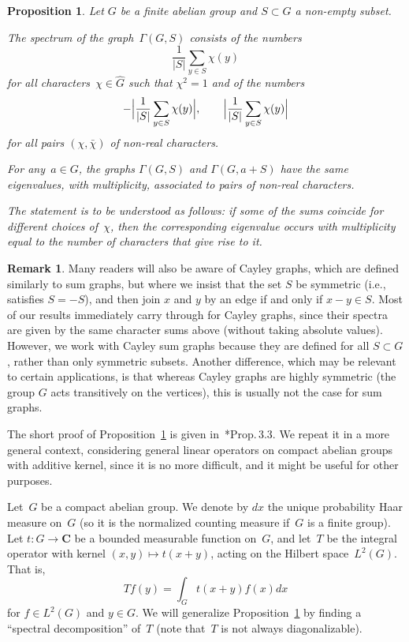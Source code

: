 \documentclass[12pt]{amsart}
\numberwithin{equation}{section}
\newcommand{\Cc}{\mathbf{C}}
\theoremstyle{plain}
\newtheorem{proposition}[theorem]{Proposition}
\theoremstyle{remark}
\theoremstyle{definition}
\newtheorem{remark}[theorem]{Remark}
\begin{document}
\begin{proposition}\label{pr-1}
  Let $G$ be a finite abelian group and $S\subset G$ a non-empty subset.
  \begin{enumth}
  \item The spectrum of the graph~$\Gamma(G,S)$ consists of the
    numbers
    \[
      \frac{1}{|S|}\sum_{y\in S}\chi(y)
    \]
    for all characters~$\chi\in \widehat{G}$ such that $\chi^2=1$ and of
    the numbers
    \[
      -\Bigl|\frac{1}{|S|}\sum_{y\in S}\chi(y)\Bigr|,\quad\quad
      \Bigl|\frac{1}{|S|}\sum_{y\in S}\chi(y)\Bigr|
    \]
    for all pairs $(\chi,\bar{\chi})$ of non-real characters.
    
  \item For any~$a\in G$, the graphs $\Gamma(G,S)$ and $\Gamma(G,a+S)$
    have the same eigenvalues, with multiplicity, associated to pairs
    of non-real characters.
\end{enumth}

The statement is to be understood as follows: if some of the sums coincide for different choices of~$\chi$, then the corresponding eigenvalue occurs with
multiplicity equal to the number of characters that give rise to it.
\end{proposition}

\begin{remark}
  Many readers will also be aware of Cayley graphs, which are defined
  similarly to sum graphs, but where we insist that the set $S$ be
  symmetric (i.e., satisfies $S=-S$), and then join $x$ and $y$ by an
  edge if and only if $x-y \in S$. Most of our results immediately carry
  through for Cayley graphs, since their spectra are given by the same
  character sums above (without taking absolute values). However, we
  work with Cayley sum graphs because they are defined for all
  $S \subset G$, rather than only symmetric subsets. Another difference,
  which may be relevant to certain applications, is that whereas Cayley
  graphs are highly symmetric (the group $G$ acts transitively on the
  vertices), this is usually not the case for sum graphs.
\end{remark}

The short proof of Proposition~\ref{pr-1} is given
in~\cite{short}*{Prop.\,3.3}. We repeat it in a more general context,
considering general linear operators on compact abelian groups with
additive kernel, since it is no more difficult, and it might be useful for
other purposes.

Let~$G$ be a compact abelian group. We denote by $dx$ the unique
probability Haar measure on~$G$ (so it is the normalized counting
measure if~$G$ is a finite group). Let $t\colon G\to\Cc$ be a bounded
measurable function on~$G$, and let~$T$ be the integral operator with
kernel $(x,y)\mapsto t(x+y)$, acting on the Hilbert space~$L^2(G)$. That is,
\[
  Tf(y)=\int_Gt(x+y)f(x)dx
\] 
for $f\in L^2(G)$ and $y\in G$. We will generalize Proposition~\ref{pr-1} by finding a ``spectral
decomposition'' of~$T$ (note that~$T$ is not always diagonalizable).
\end{document}
